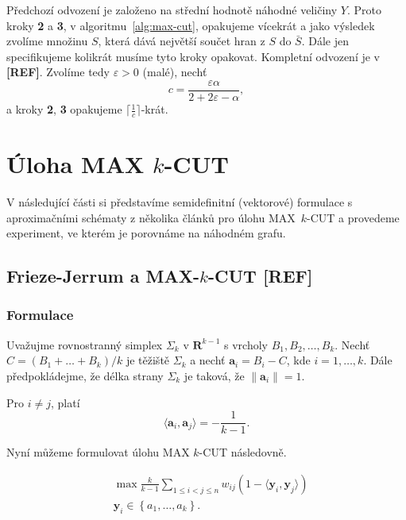 Předchozí odvození je založeno na střední hodnotě náhodné veličiny $Y$. Proto kroky \textbf{2} a \textbf{3}, v algoritmu~\ref{alg:max-cut}, opakujeme vícekrát a jako výsledek zvolíme množinu $S$, která dává největší součet hran z $S$ do $\bar{S}$. Dále jen specifikujeme kolikrát musíme tyto kroky opakovat. Kompletní odvození je v \textbf{[REF]}. Zvolíme tedy $\varepsilon > 0$ (malé), nechť
$$
    c = \frac{\varepsilon \alpha}{2 + 2\varepsilon - \alpha},
$$
a kroky \textbf{2}, \textbf{3} opakujeme $\lceil \frac{1}{c} \rceil$-krát.


\section{Úloha MAX $k$-CUT}

V následující části si představíme semidefinitní (vektorové) formulace s aproximačními schématy z několika článků pro úlohu MAX~$k$-CUT a provedeme experiment, ve kterém je porovnáme na náhodném grafu.

\subsection{Frieze-Jerrum a MAX-$k$-CUT \textbf{[REF]}}

\subsubsection*{Formulace}

Uvažujme rovnostranný simplex $\Sigma_k$ v $\mathbf{R}^{k-1}$ s vrcholy $B_1, B_2, \dots, B_k$. Nechť $C = (B_1 + \dots + B_k) / k$ je těžiště $\Sigma_k$ a nechť $\mathbf{a}_i = B_i - C$, kde $i = 1, \dots, k$. Dále předpokládejme, že délka strany $\Sigma_k$ je taková, že $\|\mathbf{a}_i\| = 1$.

\begin{lm}
    Pro $i \neq j$, platí
    $$
        \langle \mathbf{a}_i, \mathbf{a}_j \rangle = -\frac{1}{k-1}.
    $$
\end{lm}

\noindent Nyní můžeme formulovat úlohu MAX $k$-CUT následovně.

\begin{equation}\tag{FJ}
    \begin{split}
        &\max \frac{k}{k-1} \sum_{1 \leq i < j \leq n} w_{ij} (1 - \langle \mathbf{y}_i, \mathbf{y}_j \rangle) \\
        &\mathbf{y}_i \in \left\{ a_1, \dots, a_k \right\}.
    \end{split}
    \label{eq:FJ}
\end{equation}

